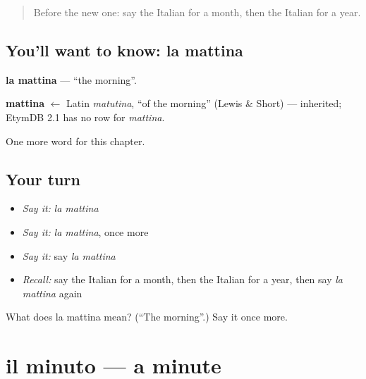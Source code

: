 \label{lesson:IT-C78-mattina}



\begin{quote}
Before the new one: say the Italian for a month, then the Italian for a year.
\end{quote}

\subsection*{You'll want to know: la mattina}
\textbf{la mattina} — \textquotedblleft{}the morning\textquotedblright{}.

\begin{cousinweb}
\textbf{mattina} $\leftarrow$ Latin \emph{matutina}, \textquotedblleft{}of the morning\textquotedblright{} (Lewis \& Short) — inherited; EtymDB 2.1 has no row for \emph{mattina}.
\end{cousinweb}

\begin{grammarlens}[title={What you've built}]
One more word for this chapter.
\end{grammarlens}

\subsection*{Your turn}
\begin{itemize}
\raggedright
  \item \emph{Say it:} \emph{la mattina}
  \item \emph{Say it:} \emph{la mattina}, once more
  \item \emph{Say it:} say \emph{la mattina}
  \item \emph{Recall:} say the Italian for a month, then the Italian for a year, then say \emph{la mattina} again
\end{itemize}

\begin{tcolorbox}[breakable,colback=teal!4,colframe=teal!35!black,title={Before you move on}]
What does la mattina mean? (\textquotedblleft{}The morning\textquotedblright{}.) Say it once more.
\end{tcolorbox}
\section[il minuto]{il minuto — a minute}

\label{lesson:IT-C78-minuto}



